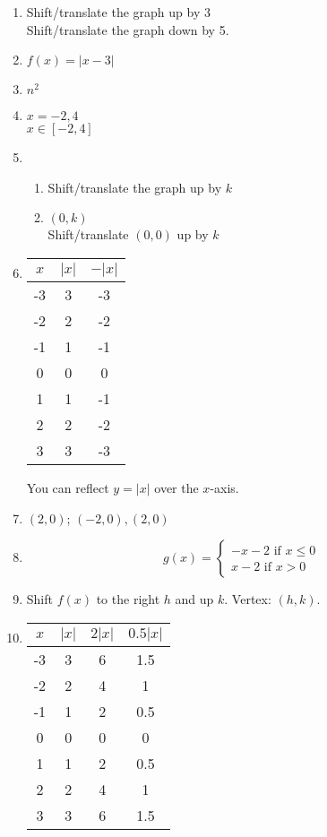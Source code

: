 \documentclass{article}
\begin{document}
\begin{enumerate}
\item Shift/translate the graph up by 3 \\
	Shift/translate the graph down by 5.

\item $f(x) = |x - 3|$

\item $n^2$

\item $x = -2, 4$ \\
	$x \in [-2, 4]$
	
\item
	\begin{enumerate}
	
	\item Shift/translate the graph up by $k$
	
	\item $(0, k)$ \\
		Shift/translate $(0, 0)$ up by $k$
	
	\end{enumerate}
	
\item
	\begin{tabular}{c | c | c}
	$x$ & $|x|$ & $-|x|$ \\
	\hline
	-3 & 3 & -3 \\
	-2 & 2 & -2 \\
	-1 & 1 & -1 \\
	0 & 0 & 0 \\
	1 & 1 & -1 \\
	2 & 2 & -2 \\
	3 & 3 & -3
	\end{tabular}
	
	You can reflect $y = |x|$ over the $x$-axis.
	
\item $(2,0)$; $(-2,0), (2,0)$

\item
	\begin{equation*}
	g(x) = \begin{cases}
	-x - 2 \text{ if } x \leq 0 \\
	x - 2 \text{ if } x > 0
	\end{cases}
	\end{equation*}
	
\item Shift $f(x)$ to the right $h$ and up $k$. Vertex: $(h, k)$.

\item
	\begin{tabular}{c | c | c | c}
	$x$ & $|x|$ & $2|x|$ & $0.5|x|$ \\
	\hline
	-3 & 3 & 6 & 1.5 \\
	-2 & 2 & 4  & 1\\
	-1 & 1 & 2 & 0.5 \\
	0 & 0 & 0 & 0 \\
	1 & 1 & 2 & 0.5 \\
	2 & 2 & 4 & 1 \\
	3 & 3 & 6 & 1.5
	\end{tabular}
	

\end{enumerate}
\end{document}
